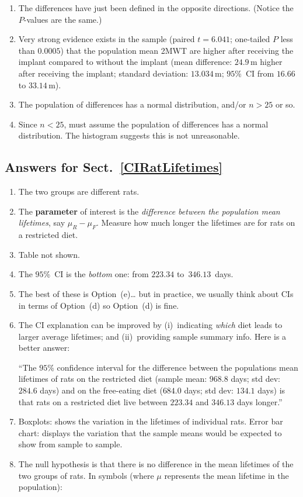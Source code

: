 \documentclass[
  11pt,
  a4paper,
  krantz2]{krantz}
\providecommand{\tightlist}{%
  \setlength{\itemsep}{0pt}\setlength{\parskip}{0pt}}
\begin{document}
\begin{footnotesize}
\begin{enumerate}
  \(t = 6.041\) and since \(t\) is very large, expect \(P\) to be very small.
\item
  The differences have just been defined in the opposite directions.
  (Notice the \(P\)-values are the same.)
\item
  Very strong evidence exists in the sample (paired \(t = 6.041\); one-tailed \(P\) less than \(0.0005\)) that the population mean 2MWT are higher after receiving the implant compared to without the implant (mean difference: \(24.9\,\text{m}\) higher after receiving the implant; standard deviation: \(13.034\,\text{m}\); \(95\)\%~CI from \(16.66\) to \(33.14\,\text{m}\)).
\item
  The population of differences has a normal distribution, and/or \(n > 25\) or so.
\item
  Since \(n < 25\), must assume the population of differences has a normal distribution.
  The histogram suggests this is not unreasonable.
\end{enumerate}

\subsection*{Answers for Sect.~\ref{CIRatLifetimes}}\label{answers-for-sect.-refciratlifetimes}

\begin{enumerate}
\def\labelenumi{\arabic{enumi}.}
\item
  The two groups are different rats. \tightlist
\item
  The \textbf{parameter} of interest is the \emph{difference between the population mean lifetimes}, say \(\mu_R - \mu_F\).
  Measure how much longer the lifetimes are for rats on a restricted diet.
\item
  Table not shown.
\item
  The \(95\)\%~CI is the \emph{bottom} one: from \(223.34\) to~\(346.13\)~days.
\item
  The best of these is Option~(e)\ldots{} but in practice, we usually think about CIs in terms of Option~(d) so Option~(d) is fine.
\item
  The CI explanation can be improved by (i)~indicating \emph{which} diet leads to larger average lifetimes; and (ii)~providing sample summary info. Here is a better answer:

  ``The \(95\)\% confidence interval for the difference between the populations mean lifetimes of rats on the restricted diet (sample mean: \(968.8\) days; std dev: \(284.6\) days) and on the free-eating diet (\(684.0\) days; std dev: \(134.1\) days) is that rats on a restricted diet live between \(223.34\) and \(346.13\) days longer.''
\item
  Boxplots: shows the variation in the lifetimes of individual rats.
  Error bar chart: displays the variation that the sample means would be expected to show from sample to sample.
\item
  The null hypothesis is that there is no difference in the mean lifetimes of the two groups of rats.
  In symbols (where \(\mu\) represents the mean lifetime in the population):


\end{enumerate}
\end{footnotesize}
\end{document}
